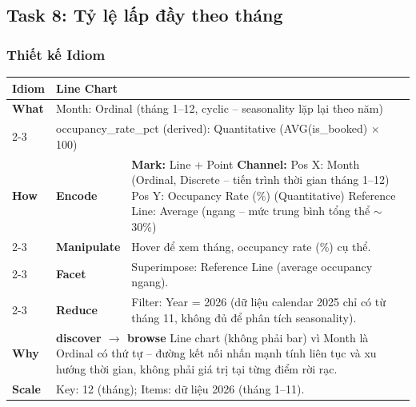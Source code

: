\subsection{Task 8: Tỷ lệ lấp đầy theo tháng}

\subsubsection{Thiết kế Idiom}

\begin{table}[H]
\centering
\renewcommand{\arraystretch}{1.1}
\begin{tabularx}{\textwidth}{|l|l|X|}
\hline
\textbf{Idiom} & \multicolumn{2}{l|}{\textbf{Line Chart}} \\ \hline
\textbf{What}
& \multicolumn{2}{X|}{Month: Ordinal (tháng 1--12, cyclic -- seasonality lặp lại theo năm)} \\ \cline{2-3}
& \multicolumn{2}{X|}{occupancy\_rate\_pct (derived): Quantitative (AVG(is\_booked) $\times$ 100)} \\ \hline
\textbf{How}
& \textbf{Encode} &
\textbf{Mark:} Line + Point \newline
\textbf{Channel:} \newline
\hspace*{1em} Pos X: Month (Ordinal, Discrete -- tiến trình thời gian tháng 1--12) \newline
\hspace*{1em} Pos Y: Occupancy Rate (\%) (Quantitative) \newline
\hspace*{1em} Reference Line: Average (ngang -- mức trung bình tổng thể $\sim$30\%) \\ \cline{2-3}
& \textbf{Manipulate} &
Hover để xem tháng, occupancy rate (\%) cụ thể. \\ \cline{2-3}
& \textbf{Facet} &
Superimpose: Reference Line (average occupancy ngang). \\ \cline{2-3}
& \textbf{Reduce} &
Filter: Year = 2026 (dữ liệu calendar 2025 chỉ có từ tháng 11, không đủ để phân tích seasonality). \\ \hline
\textbf{Why} & \multicolumn{2}{X|}{
\textbf{discover $\rightarrow$ browse} \newline
Line chart (không phải bar) vì Month là Ordinal có thứ tự -- đường kết nối nhấn mạnh tính liên tục và xu hướng thời gian, không phải giá trị tại từng điểm rời rạc.
} \\ \hline
\textbf{Scale} & \multicolumn{2}{X|}{
Key: 12 (tháng); Items: dữ liệu 2026 (tháng 1--11).
} \\ \hline
\end{tabularx}
\end{table}

